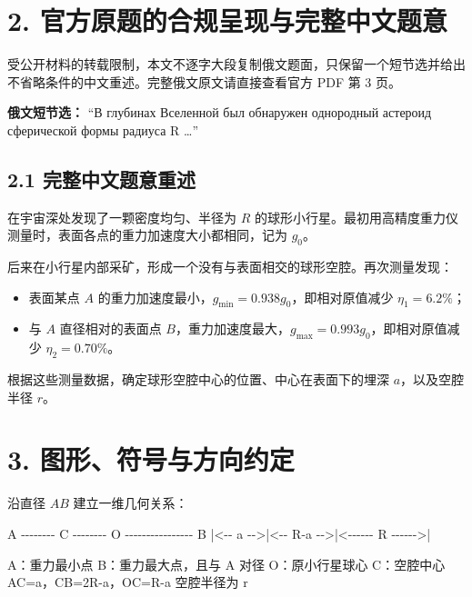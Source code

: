 \documentclass[
  11pt,
  UTF8]{ctexart}
\newenvironment{Shaded}{}{}
\newcommand{\NormalTok}[1]{#1}
\providecommand{\tightlist}{%
  \setlength{\itemsep}{0pt}\setlength{\parskip}{0pt}}
\begin{document}
\hypertarget{ux5b98ux65b9ux539fux9898ux7684ux5408ux89c4ux5448ux73b0ux4e0eux5b8cux6574ux4e2dux6587ux9898ux610f}{%
\section{2.
官方原题的合规呈现与完整中文题意}\label{ux5b98ux65b9ux539fux9898ux7684ux5408ux89c4ux5448ux73b0ux4e0eux5b8cux6574ux4e2dux6587ux9898ux610f}}

受公开材料的转载限制，本文不逐字大段复制俄文题面，只保留一个短节选并给出不省略条件的中文重述。完整俄文原文请直接查看官方
PDF 第 3 页。

\textbf{俄文短节选：} ``В глубинах Вселенной был обнаружен однородный
астероид сферической формы радиуса R \ldots{}''

\hypertarget{ux5b8cux6574ux4e2dux6587ux9898ux610fux91cdux8ff0}{%
\subsection{2.1
完整中文题意重述}\label{ux5b8cux6574ux4e2dux6587ux9898ux610fux91cdux8ff0}}

在宇宙深处发现了一颗密度均匀、半径为 \(R\)
的球形小行星。最初用高精度重力仪测量时，表面各点的重力加速度大小都相同，记为
\(g_0\)。

后来在小行星内部采矿，形成一个没有与表面相交的球形空腔。再次测量发现：

\begin{itemize}
\tightlist
\item
  表面某点 \(A\) 的重力加速度最小，\(g_{\min}=0.938g_0\)，即相对原值减少
  \(η_1=6.2\%\)；
\item
  与 \(A\) 直径相对的表面点
  \(B\)，重力加速度最大，\(g_{\max}=0.993g_0\)，即相对原值减少
  \(η_2=0.70\%\)。
\end{itemize}

根据这些测量数据，确定球形空腔中心的位置、中心在表面下的埋深
\(a\)，以及空腔半径 \(r\)。

\hypertarget{ux56feux5f62ux7b26ux53f7ux4e0eux65b9ux5411ux7ea6ux5b9a}{%
\section{3.
图形、符号与方向约定}\label{ux56feux5f62ux7b26ux53f7ux4e0eux65b9ux5411ux7ea6ux5b9a}}

沿直径 \(AB\) 建立一维几何关系：

\begin{Shaded}
\begin{Highlighting}[]
\NormalTok{A {-}{-}{-}{-}{-}{-}{-}{-} C {-}{-}{-}{-}{-}{-}{-}{-} O {-}{-}{-}{-}{-}{-}{-}{-}{-}{-}{-}{-}{-}{-}{-}{-} B}
\NormalTok{|\textless{}{-}{-} a {-}{-}\textgreater{}|\textless{}{-}{-} R{-}a {-}{-}\textgreater{}|\textless{}{-}{-}{-}{-}{-}{-} R {-}{-}{-}{-}{-}{-}\textgreater{}|}


\NormalTok{A：重力最小点}
\NormalTok{B：重力最大点，且与 A 对径}
\NormalTok{O：原小行星球心}
\NormalTok{C：空腔中心}
\NormalTok{AC=a，CB=2R{-}a，OC=R{-}a}
\NormalTok{空腔半径为 r}
\end{Highlighting}
\end{Shaded}
\end{document}
